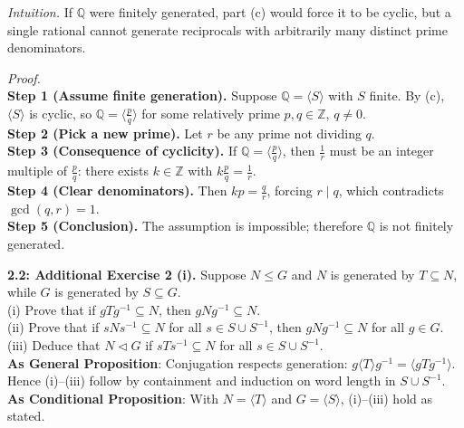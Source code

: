 \documentclass[12pt]{article}
\theoremstyle{definition}
\begin{document}
\newpage

\dotfill

\emph{Intuition.} If $\mathbb Q$ were finitely generated, part (c) would force it to be cyclic, but a single rational cannot generate reciprocals with arbitrarily many distinct prime denominators.\\

\dotfill

\emph{Proof.}\\
\textbf{Step 1 (Assume finite generation).} Suppose $\mathbb Q=\langle S\rangle$ with $S$ finite. By (c), $\langle S\rangle$ is cyclic, so $\mathbb Q=\langle \tfrac{p}{q}\rangle$ for some relatively prime $p,q\in\mathbb Z$, $q\ne0$.\\
\textbf{Step 2 (Pick a new prime).} Let $r$ be any prime not dividing $q$.\\
\textbf{Step 3 (Consequence of cyclicity).} If $\mathbb Q=\langle \tfrac{p}{q}\rangle$, then $\frac{1}{r}$ must be an integer multiple of $\frac{p}{q}$: there exists $k\in\mathbb Z$ with $k\frac{p}{q}=\frac{1}{r}$.\\
\textbf{Step 4 (Clear denominators).} Then $k p=\frac{q}{r}$, forcing $r\mid q$, which contradicts $\gcd(q,r)=1$.\\
\textbf{Step 5 (Conclusion).} The assumption is impossible; therefore $\mathbb Q$ is not finitely generated.\\

\newpage

\noindent \textbf{2.2: Additional Exercise 2 (i).} 
Suppose $N\le G$ and $N$ is generated by $T\subseteq N$, while $G$ is generated by $S\subseteq G$.\\
(i) Prove that if $gTg^{-1}\subseteq N$, then $gNg^{-1}\subseteq N$.\\
(ii) Prove that if $sNs^{-1}\subseteq N$ for all $s\in S\cup S^{-1}$, then $gNg^{-1}\subseteq N$ for all $g\in G$.\\
(iii) Deduce that $N\lhd G$ if $sTs^{-1}\subseteq N$ for all $s\in S\cup S^{-1}$.\\ %

\noindent\textbf{As General Proposition}: Conjugation respects generation: $g\langle T\rangle g^{-1}=\langle gTg^{-1}\rangle$. Hence (i)–(iii) follow by containment and induction on word length in $S\cup S^{-1}$.\\

\noindent \textbf{As Conditional Proposition}: With $N=\langle T\rangle$ and $G=\langle S\rangle$, (i)–(iii) hold as stated.
\end{document}
